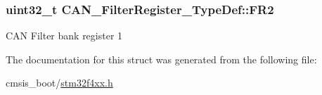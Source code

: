 \subsubsection[{\texorpdfstring{F\+R2}{FR2}}]{ uint32\+\_\+t C\+A\+N\+\_\+\+Filter\+Register\+\_\+\+Type\+Def\+::\+F\+R2}\hypertarget{struct_c_a_n___filter_register___type_def_a77959e28a302b05829f6a1463be7f800}{}\label{struct_c_a_n___filter_register___type_def_a77959e28a302b05829f6a1463be7f800}
C\+AN Filter bank register 1 

The documentation for this struct was generated from the following file\+:\begin{DoxyCompactItemize}
\item 
cmsis\+\_\+boot/\hyperlink{stm32f4xx_8h}{stm32f4xx.\+h}\end{DoxyCompactItemize}
